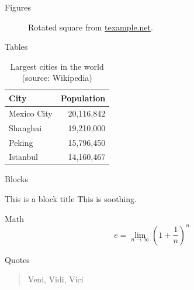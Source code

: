 \documentclass[12pt, compress]{beamer}
\begin{document}
\begin{frame}{Figures}
  \begin{figure}
    \setcounter{density}{20}
    \caption{Rotated square from
    \href{http://www.texample.net/tikz/examples/rotated-polygons/}{texample.net}.}
  \end{figure}
\end{frame}
\begin{frame}{Tables}
  \begin{table}
    \caption{Largest cities in the world (source: Wikipedia)}
    \begin{tabular}{lr}
      \toprule
      City & Population\\
      \midrule
      Mexico City & 20,116,842\\
      Shanghai & 19,210,000\\
      Peking & 15,796,450\\
      Istanbul & 14,160,467\\
      \bottomrule
    \end{tabular}
  \end{table}
\end{frame}
\begin{frame}{Blocks}

  \begin{block}{This is a block title}
    This is soothing.
  \end{block}

\end{frame}
\begin{frame}{Math}
  \begin{equation*}
    e = \lim_{n\to \infty} \left(1 + \frac{1}{n}\right)^n
  \end{equation*}
\end{frame}
\begin{frame}{Quotes}
  \begin{quote}
    Veni, Vidi, Vici
  \end{quote}
\end{frame}
\end{document}
